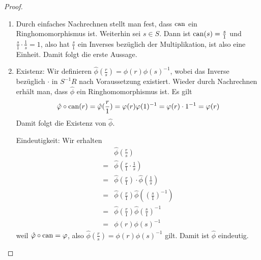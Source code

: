 \documentclass[12pt,a4paper]{scrartcl}
\begin{document}
\begin{proof}
	\leavevmode
	\begin{enumerate}
		\item Durch einfaches Nachrechnen stellt man fest, dass $\operatorname{can}$ ein Ringhomomorphismus ist. Weiterhin sei $s\in S$. Dann ist $\operatorname{can}(s) = \frac s1$ und $\frac s1\cdot \frac1s = 1$, also hat $\frac s1$ ein Inverses bezüglich der Multiplikation, ist also eine Einheit. Damit folgt die erste Aussage.
		\item Existenz: Wir definieren $\hat{\phi}(\frac rs) = \phi(r)\phi(s)^{-1}$, wobei das Inverse bezüglich $\cdot$ in $S^{-1}R$ nach Voraussetzung existiert.
		Wieder durch Nachrechnen erhält man, dass $\hat{\phi}$ ein Ringhomomorphismus ist. Es gilt $$\hat{\varphi}\circ \operatorname{can}(r) = \hat{\varphi}(\frac r1) = \varphi(r)\varphi(1)^{-1} = \varphi(r)\cdot 1^{-1} = \varphi(r) $$ 
		Damit folgt die Existenz von $\hat{\phi}$.
		
		Eindeutigkeit: Wir erhalten
		\begin{align*}
		&\hat{\phi}\left(\frac rs \right) \\
		=& \hat{\phi} \left(\frac r1\cdot \frac1s \right) \\
		=& \hat{\phi}\left(\frac r1 \right)\cdot \hat{\phi}\left(\frac1s \right) \\
		=& \hat{\phi}\left(\frac r1 \right)\hat{\phi}\left(\left(\frac s1 \right)^{-1} \right) \\
		=& \hat{\phi}\left(\frac r1 \right)\hat{\phi}\left(\frac s1 \right)^{-1} \\
		=& \phi(r)\phi(s)^{-1}
		\end{align*} 
		weil $\hat{\varphi}\circ\operatorname{can} = \varphi$, also $\hat{\phi}(\frac rs) = \phi(r)\phi(s)^{-1}$ gilt. Damit ist $\hat{\phi}$ eindeutig.
		\qedhere
	\end{enumerate}
\end{proof}
\end{document}
